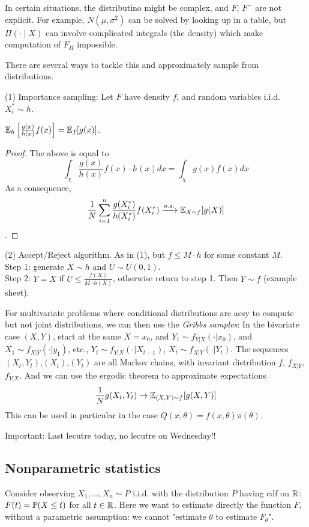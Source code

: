\documentclass[a4paper]{article}
\begin{document}
In certain situations, the distributino might be complex, and $F$, $F^-$ are not explicit. For example, $N(\mu,\sigma^2)$ can be solved by looking up in a table, but $\Pi (\cdot \mid X)$ can involve complicated integrals (the density) which make computation of $F_\Pi$ impossible.

There are several ways to tackle this and approximately sample from distributions.

(1) Importance sampling: Let $F$ have density $f$, and random variables i.i.d. $X_i^* \sim h$.

\begin{prop}
$\E_h \left[\frac{g(x)}{h(x)} f(x)\right] = \E_f [g(x)]$.
\begin{proof}
The above is equal to $$ \int_\chi \frac{g(x)}{h(x)} f(x) \cdot h(x) dx = \int_\chi g(x) f(x) dx$$ As a consequence, $$\frac{1}{N} \sum_{i=1}^n \frac{g(X_i^*)}{h(X_i^*)} f(X_i^*) \xrightarrow{a.s.} \E_{X \sim f} [g(X)]$$.
\end{proof}
\end{prop}

(2) Accept/Reject algorithm. As in (1), but $f \leq M\cdot h$ for some constant $M$.\\
Step 1: generate $X \sim h$ and $U \sim U(0,1)$.\\
Step 2: $Y=X$ if $U \leq \frac{f(X)}{M\cdot h(X)}$, otherwise return to step 1. Then $Y \sim f$ (example sheet).

For multivariate problems where conditional distributions are aesy to compute but not joint distributions, we can then use the \emph{Gribbs samples}: In the bivariate case $(X,Y)$, start at the same $X = x_0$, and $Y_1 \sim f_{Y|X}(\cdot |x_0)$, and $X_1 \sim f_{X|Y}(\cdot |y_1)$, etc., $Y_t \sim f_{Y|X}(\cdot | X_{t-1})$, $X_t \sim f_{X|Y}(\cdot | Y_t)$. The sequences $(X_t,Y_t)$,$(X_t)$,$(Y_t)$ are all Markov chains, with invariant distribution $f$, $f_{X|Y}$, $f_{Y|X}$. And we can use the ergodic theorem to approximate expectations $$\frac{1}{N} g(X_t,Y_t) \to \E_{(X,Y) \sim f} [g(X,Y)]$$ This can be used in particular in the case $Q(x,\theta) = f(x,\theta) \pi (\theta)$.

Important: Last lecutre today, no lecutre on Wednesday!!

\subsection{Nonparametric statistics}
Consider observing $X_1,...,X_n \sim P$ i.i.d. with the distribution $P$ having cdf on $\R$: $F(t) = \P(X \leq t)$ for all $t \in \R$. Here we want to estimate directly the function $F$, without a parametric assumption: we cannot "estimate $\theta$ to estimate $F_\theta$".
\end{document}
